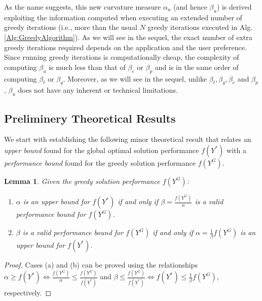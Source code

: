 \documentclass[conference]{IEEEtran}
\newtheorem{lemma}{Lemma}
\begin{document}
As the name suggests, this new curvature measure $\alpha_u$ (and hence $\beta_u$) is derived exploiting the information computed when executing an extended number of greedy iterations (i.e., more than the usual $N$ greedy iterations executed in Alg. \ref{Alg:GreedyAlgorithm}). As we will see in the sequel, the exact number of extra greedy iterations required depends on the application and the user preference. Since running greedy iterations is computationally cheap, the complexity of computing $\beta_u$ is much less than that of $\beta_e$ or $\beta_p$ and is in the same order of computing $\beta_t$ or $\beta_g$. Moreover, as we will see in the sequel, unlike  $\beta_t,\beta_g,\beta_e$ and $\beta_p$, $\beta_u$ does not have any inherent or technical limitations. 





\subsection{Preliminery Theoretical Results}
We start with establishing the following minor theoretical result that relates an \emph{upper bound} found for the global optimal solution performance $f(Y^*)$ with a \emph{performance bound} found for the greedy solution performance $f(Y^G)$.

\begin{lemma}\label{Lm:UpperBoundVsPerformanceBound}
Given the greedy solution performance $f(Y^G)$: 
\begin{enumerate}[label=(\alph*)]
    \item $\alpha$ is an upper bound for $f(Y^*)$ if and only if 
    $\beta = \frac{f(Y^G)}{\alpha}$ is a valid performance bound for $f(Y^G)$.
    \item $\beta$ is a valid performance bound for $f(Y^G)$ if and only if $\alpha = \frac{1}{\beta}f(Y^G)$ is an upper bound for $f(Y^*)$.
\end{enumerate} 
\end{lemma}
\begin{proof}
Cases (a) and (b) can be proved using the relationships $\alpha \geq f(Y^*) \iff \frac{f(Y^G)}{\alpha} \leq \frac{f(Y^G)}{f(Y^*)}$ and $\beta \leq \frac{f(Y^G)}{f(Y^*)} \iff f(Y^*) \leq \frac{1}{\beta}f(Y^G)$, respectively.
\end{proof}
\end{document}
